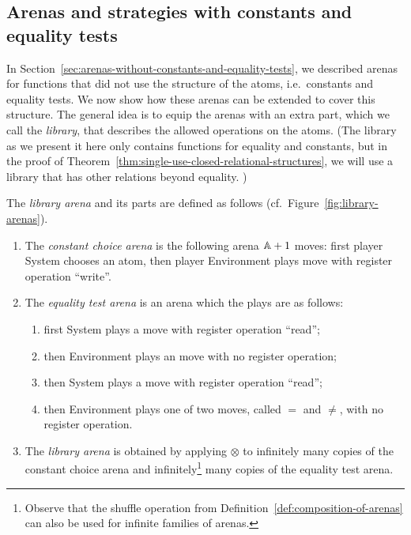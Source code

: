 \documentclass[a4paper,UKenglish,cleveref, autoref, numberwithinsect, thm-restate]{lipics-v2021}
\begin{document}
\subsection{Arenas and strategies with constants and equality tests}
\label{sec:arenas-with-constants-and-equality-tests}
In Section~\ref{sec:arenas-without-constants-and-equality-tests}, we described arenas for functions that did not use the structure of the atoms, i.e.~constants and equality tests. We now show how these arenas can be extended to cover this structure. The general idea is to equip the arenas with an extra part, which we call the \emph{library},  that describes the allowed operations on the atoms. (The library as we present it here only contains functions for equality and constants, but in the proof of Theorem~\ref{thm:single-use-closed-relational-structures}, we will use a library that has other relations beyond equality. )



\begin{definition}\label{def:library-arena} The \emph{library arena} and its parts are defined as follows (cf.~Figure~\ref{fig:library-arenas}).
    \begin{enumerate}
        \item The \emph{constant choice arena} is the following arena $\mathbb A+1$ moves:
        first player System chooses an atom, then player Environment plays move with register operation ``write''. 
        \item The \emph{equality test arena} is an arena which the plays are as follows:
    \begin{enumerate}
        \item first System plays a move with register operation ``read'';
        \item then Environment plays an move with no register operation;
        \item then System plays a move with register operation ``read'';
        \item then Environment plays one of two moves, called $=$ and $\neq$, with no register operation.
    \end{enumerate}
    \item The \emph{library arena} is obtained by applying $\otimes$ to infinitely many copies of the constant choice arena and infinitely\footnote{
        Observe that the shuffle operation from Definition~\ref{def:composition-of-arenas} can also be used for infinite families of arenas.
    } many copies of the  equality test arena. 
    \end{enumerate}
\end{definition}
\end{document}

